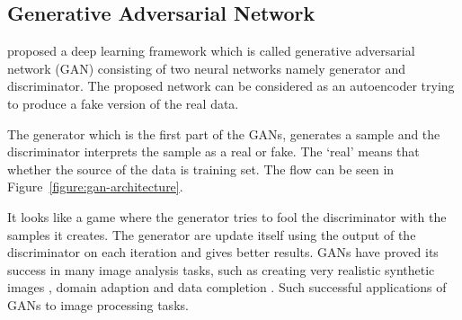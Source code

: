     \subsection{Generative Adversarial Network}

        \citet{goodfellow2014generative} proposed a deep learning framework which is called generative adversarial network (GAN) consisting of two neural networks namely generator and discriminator.
        The proposed network can be considered as an autoencoder trying to produce a fake version of the real data.

        The generator which is the first part of the GANs, generates a sample and the discriminator interprets the sample as a real or fake.
        The ‘real’ means that whether the source of the data is training set. The flow can be seen in Figure~\ref{figure:gan-architecture}.

        

        It looks like a game where the generator tries to fool the discriminator with the samples it creates.
        The generator are update itself using the output of the discriminator on each iteration and gives better results.
        GANs have proved its success in many image analysis tasks, such as creating very realistic synthetic images \cite{shrivastava2017learning},
        domain adaption \cite{bousmalis2017unsupervised} and data completion \cite{yeh2017semantic}.
        Such successful applications of GANs to image processing tasks.
